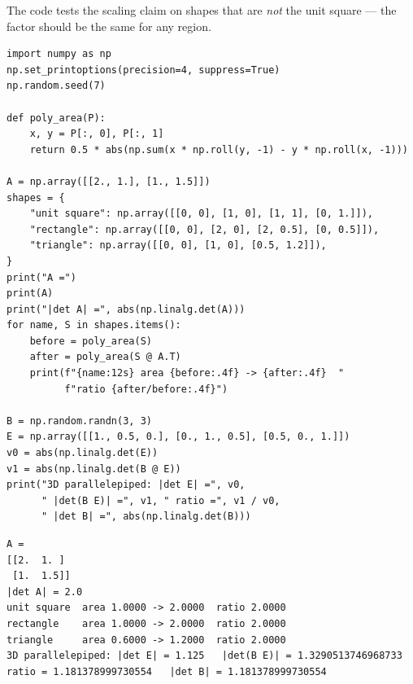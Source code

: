 The code tests the scaling claim on shapes that are \emph{not} the unit
square --- the factor should be the same for any region.

\begin{lstlisting}[caption={\ttfamily code/ch06\_volume\_scaling.py ---
areas of three different shapes before/after a $2\times2$ map, then a
parallelepiped through a $3\times3$.}]
import numpy as np
np.set_printoptions(precision=4, suppress=True)
np.random.seed(7)

def poly_area(P):
    x, y = P[:, 0], P[:, 1]
    return 0.5 * abs(np.sum(x * np.roll(y, -1) - y * np.roll(x, -1)))

A = np.array([[2., 1.], [1., 1.5]])
shapes = {
    "unit square": np.array([[0, 0], [1, 0], [1, 1], [0, 1.]]),
    "rectangle": np.array([[0, 0], [2, 0], [2, 0.5], [0, 0.5]]),
    "triangle": np.array([[0, 0], [1, 0], [0.5, 1.2]]),
}
print("A =")
print(A)
print("|det A| =", abs(np.linalg.det(A)))
for name, S in shapes.items():
    before = poly_area(S)
    after = poly_area(S @ A.T)
    print(f"{name:12s} area {before:.4f} -> {after:.4f}  "
          f"ratio {after/before:.4f}")

B = np.random.randn(3, 3)
E = np.array([[1., 0.5, 0.], [0., 1., 0.5], [0.5, 0., 1.]])
v0 = abs(np.linalg.det(E))
v1 = abs(np.linalg.det(B @ E))
print("3D parallelepiped: |det E| =", v0,
      " |det(B E)| =", v1, " ratio =", v1 / v0,
      " |det B| =", abs(np.linalg.det(B)))
\end{lstlisting}

\begin{lstlisting}[caption={Output of the scaling experiment. Notice every
shape scales by exactly $|\det A|=2$ --- the factor is a property of the
map, not of the region. In 3D the ratio equals $|\det B|$ to the last
digit shown, which is also the product rule at work.}]
A =
[[2.  1. ]
 [1.  1.5]]
|det A| = 2.0
unit square  area 1.0000 -> 2.0000  ratio 2.0000
rectangle    area 1.0000 -> 2.0000  ratio 2.0000
triangle     area 0.6000 -> 1.2000  ratio 2.0000
3D parallelepiped: |det E| = 1.125   |det(B E)| = 1.3290513746968733   ratio = 1.181378999730554   |det B| = 1.181378999730554
\end{lstlisting}

